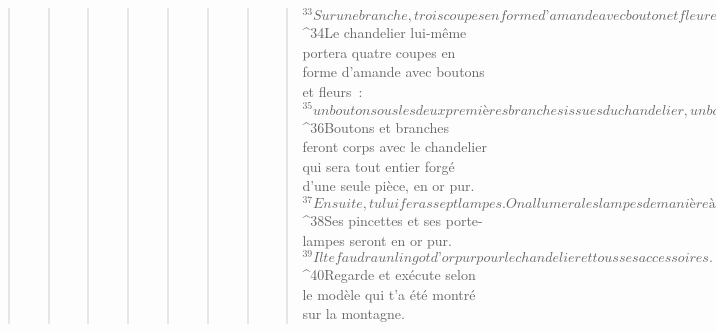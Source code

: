 \begin{verse}
\begin{verse}
\begin{verse}
\begin{verse}
\begin{verse}
\begin{verse}
\begin{verse}
\begin{verse}
${}^{33}Sur une branche, trois coupes en forme d’amande avec bouton et fleur et, sur une autre branche, trois coupes en forme d’amande avec bouton et fleur ; de même pour les six branches sortant du chandelier. 
${}^{34}Le chandelier lui-même portera quatre coupes en forme d’amande avec boutons et fleurs : 
${}^{35}un bouton sous les deux premières branches issues du chandelier, un bouton sous les deux suivantes et un bouton sous les deux dernières ; ainsi donc pour les six branches qui sortent du chandelier. 
${}^{36}Boutons et branches feront corps avec le chandelier qui sera tout entier forgé d’une seule pièce, en or pur. 
${}^{37}Ensuite, tu lui feras sept lampes. On allumera les lampes de manière à éclairer l’espace qui est devant lui. 
${}^{38}Ses pincettes et ses porte-lampes seront en or pur. 
${}^{39}Il te faudra un lingot d’or pur pour le chandelier et tous ses accessoires. 
${}^{40}Regarde et exécute selon le modèle qui t’a été montré sur la montagne.
      

\end{verse}
\end{verse}
\end{verse}
\end{verse}
\end{verse}
\end{verse}
\end{verse}
\end{verse}
